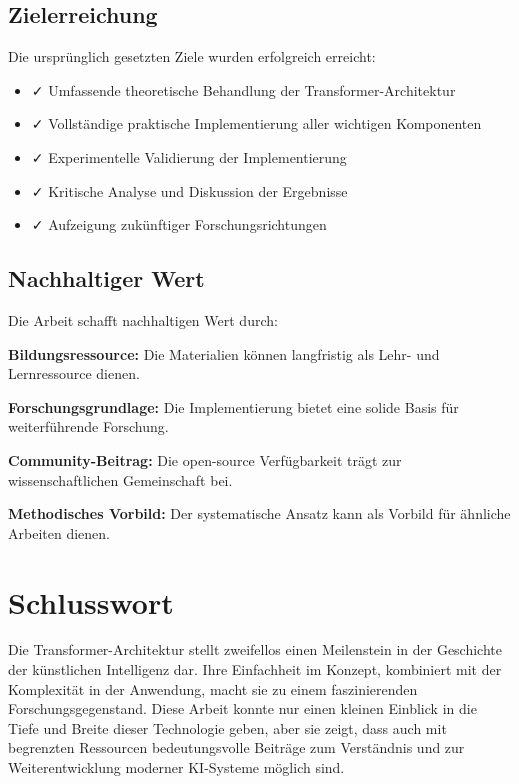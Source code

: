 \subsection{Zielerreichung}

Die ursprünglich gesetzten Ziele wurden erfolgreich erreicht:

\begin{itemize}
    \item ✓ Umfassende theoretische Behandlung der Transformer-Architektur
    \item ✓ Vollständige praktische Implementierung aller wichtigen Komponenten
    \item ✓ Experimentelle Validierung der Implementierung
    \item ✓ Kritische Analyse und Diskussion der Ergebnisse
    \item ✓ Aufzeigung zukünftiger Forschungsrichtungen
\end{itemize}

\subsection{Nachhaltiger Wert}

Die Arbeit schafft nachhaltigen Wert durch:

\textbf{Bildungsressource:} Die Materialien können langfristig als Lehr- und Lernressource dienen.

\textbf{Forschungsgrundlage:} Die Implementierung bietet eine solide Basis für weiterführende Forschung.

\textbf{Community-Beitrag:} Die open-source Verfügbarkeit trägt zur wissenschaftlichen Gemeinschaft bei.

\textbf{Methodisches Vorbild:} Der systematische Ansatz kann als Vorbild für ähnliche Arbeiten dienen.

\section{Schlusswort}

Die Transformer-Architektur stellt zweifellos einen Meilenstein in der Geschichte der künstlichen Intelligenz dar. Ihre Einfachheit im Konzept, kombiniert mit der Komplexität in der Anwendung, macht sie zu einem faszinierenden Forschungsgegenstand. Diese Arbeit konnte nur einen kleinen Einblick in die Tiefe und Breite dieser Technologie geben, aber sie zeigt, dass auch mit begrenzten Ressourcen bedeutungsvolle Beiträge zum Verständnis und zur Weiterentwicklung moderner KI-Systeme möglich sind.

